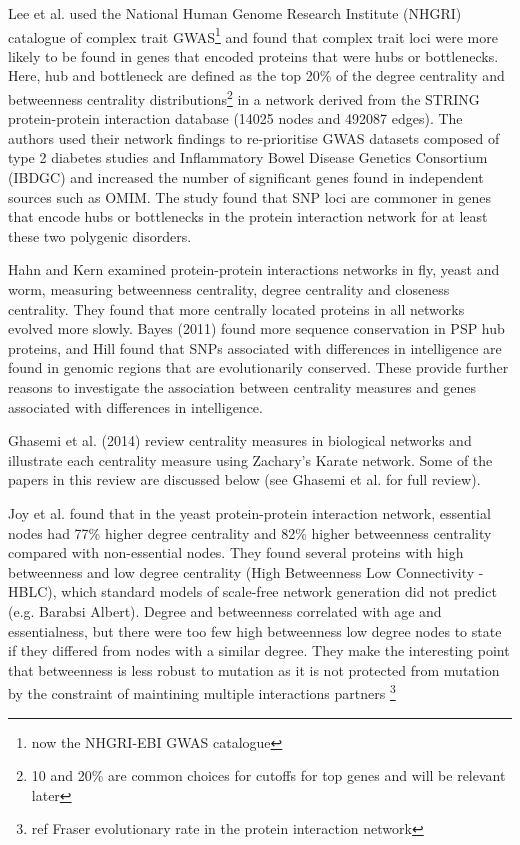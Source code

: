 Lee et al.\cite{lee2013network} used the National Human Genome Research Institute (NHGRI)  catalogue of complex trait GWAS\footnote{now the NHGRI-EBI GWAS catalogue} and found that complex trait loci were more likely to be found in genes that encoded proteins that were hubs or bottlenecks. Here, hub and bottleneck are defined as the top 20\% of the degree centrality and betweenness centrality distributions\footnote{10 and 20\% are common choices for cutoffs for top genes and will be relevant later} in a network derived from the STRING protein-protein interaction database (14025 nodes and 492087 edges). The authors used their network findings to re-prioritise GWAS datasets composed of type 2 diabetes studies and Inflammatory Bowel Disease Genetics Consortium (IBDGC) and increased the number of significant genes found in independent sources such as OMIM\cite{hamosh2005online}.  The study found that SNP loci are commoner in genes that encode hubs or bottlenecks in the protein interaction network for at least these two polygenic disorders. 






Hahn and Kern\cite{hahn2005comparative} examined protein-protein interactions networks in fly, yeast and worm, measuring betweenness centrality, degree centrality and closeness centrality. They found that more centrally located proteins in all networks evolved more slowly. Bayes (2011)\cite{bayes2011characterization} found more sequence conservation in PSP hub proteins, and Hill found that SNPs associated with differences in intelligence are found in genomic regions that are evolutionarily conserved\cite{hill2016molecular}. These provide further reasons to investigate the association between centrality measures and genes associated with differences in intelligence.






Ghasemi et al. (2014) review centrality measures in biological networks and illustrate each centrality measure using Zachary's Karate network\cite{ghasemi2014centrality}. Some of the papers in this review are discussed below (see Ghasemi et al.\cite{ghasemi2014centrality} for full review). 


    Joy et al.\cite{joy2005high} found that in the yeast protein-protein interaction network, essential nodes had 77\% higher degree centrality and 82\% higher betweenness centrality compared with non-essential nodes. They found several proteins with high betweenness and low degree centrality (High Betweenness Low Connectivity - HBLC), which standard models of scale-free network generation did not predict (e.g. Barabsi Albert). Degree and betweenness correlated with age and essentialness, but there were too few high betweenness low degree nodes to state if they differed from nodes with a similar degree. They make the interesting point that betweenness is less robust to mutation as it is not protected from mutation by the constraint of maintining multiple interactions partners \footnote{ref Fraser evolutionary rate in the protein interaction network}
    



